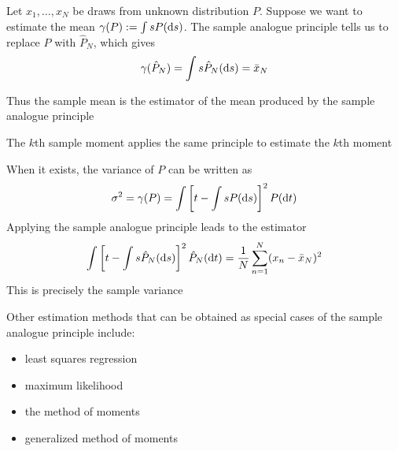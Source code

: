 \begin{frame}
    
    \vspace{2em}
    \Eg
    Let $x_1, \ldots, x_N$ be draws from unknown distribution $P$.
    Suppose we want to estimate the mean $\gamma(P) := \int sP(\mathop{}\!\mathrm{d} s)$.
    The sample analogue principle  tells us to replace $P$ with  
    $\hat P_N$, which gives
    \begin{equation*}
        \gamma(\hat P_N) = \int s \hat P_N(\mathop{}\!\mathrm{d} s) = \bar x_N
    \end{equation*}
    
    Thus the sample mean is the estimator of the mean produced by the sample
    analogue principle
    
\end{frame}

\begin{frame}

    \vspace{2em}
    The $k$th sample moment applies the same principle to estimate the $k$th moment
    
    \vspace{.7em}
    \Eg
    When it exists, the variance of $P$ can be written as 
    \begin{equation*}
        \sigma^2 = \gamma(P) = \int \left[ t - \int s P(\mathop{}\!\mathrm{d} s) \right]^2
        P(\mathop{}\!\mathrm{d} t)
    \end{equation*}
    Applying the sample analogue principle leads to the estimator
    \begin{equation*}
        \int \left[ t - \int s \hat P_N(\mathop{}\!\mathrm{d} s) \right]^2 \hat P_N(\mathop{}\!\mathrm{d} t)
            = \frac{1}{N} \sum_{n=1}^N (x_n - \bar x_N)^2
    \end{equation*}
    This is precisely the sample variance

\end{frame}

\begin{frame}
    
    \vspace{2em}
    Other estimation methods that can be obtained as special
    cases of the sample analogue principle include:
    \begin{itemize}
        \item least squares regression
        \item maximum likelihood
        \item the method of moments
        \item generalized method of moments
    \end{itemize}
    
\end{frame}

